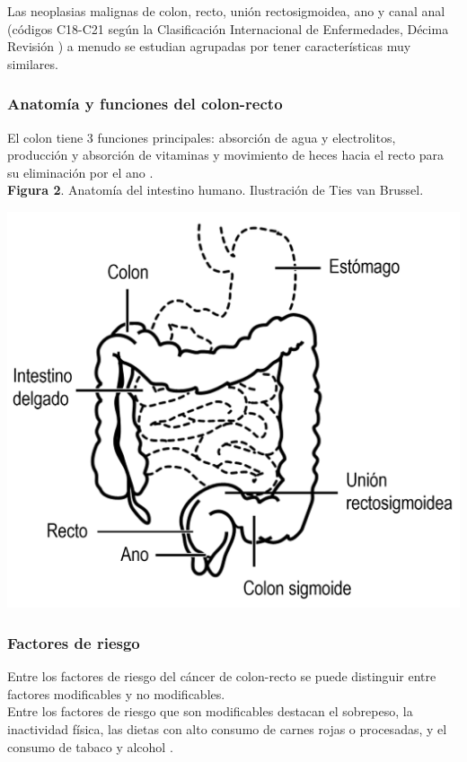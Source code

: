 Las neoplasias malignas de colon, recto, unión rectosigmoidea, ano y canal anal (códigos C18-C21 según la Clasificación Internacional de Enfermedades, Décima Revisión \cite{ICD10, cie10es}) a menudo se estudian agrupadas por tener características muy similares.

\subsubsection{Anatomía y funciones del colon-recto}

El colon tiene 3 funciones principales: absorción de agua y electrolitos, producción y absorción de vitaminas y movimiento de heces hacia el recto para su eliminación por el ano \cite{Azzouz2020}.\\

\textbf{Figura 2}. Anatomía del intestino humano. Ilustración de Ties van Brussel.
\begin{center}
	\includegraphics[width=.70\textwidth]{figuras/anatomia_cr.png} \\
\end{center}

\subsubsection{Factores de riesgo}

Entre los factores de riesgo del cáncer de colon-recto se puede distinguir entre factores modificables y no modificables.\\

Entre los factores de riesgo que son modificables destacan el sobrepeso, la inactividad física, las dietas con alto consumo de carnes rojas o procesadas, y el consumo de tabaco y alcohol \cite{AmericanCancerSociety2020}.\\

